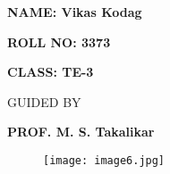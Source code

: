 \documentclass[12pt]{article}
\begin{document}
\begin{Center}
{\fontsize{14pt}{16.8pt}\selectfont  \par}
\end{Center}\par

\begin{Center}
{\fontsize{16pt}{19.2pt}\selectfont \textbf{NAME: Vikas Kodag}\par}
\end{Center}\par

\begin{Center}
{\fontsize{16pt}{19.2pt}\selectfont \textbf{ROLL NO: 3373}\par}
\end{Center}\par

\begin{Center}
{\fontsize{16pt}{19.2pt}\selectfont \textbf{CLASS: TE-3}\par}
\end{Center}\par

\begin{Center}
{\fontsize{7pt}{8.4pt}\selectfont \textbf{ }\par}
\end{Center}\par

\begin{Center}
{\fontsize{14pt}{16.8pt}\selectfont GUIDED BY\par}
\end{Center}\par

\begin{Center}
{\fontsize{16pt}{19.2pt}\selectfont \textbf{PROF. M. S. Takalikar}\par}
\end{Center}\par




\begin{figure}[H]
	\begin{Center}
		\texttt{[image: image6.jpg]}
	\end{Center}
\end{figure}


\end{document}
